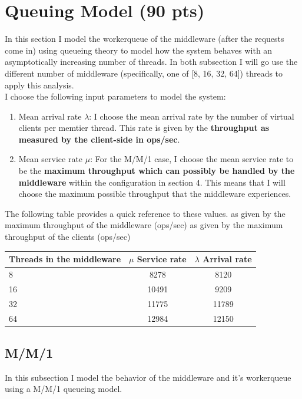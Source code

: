 \documentclass[11pt,a4paper]{article}
\begin{document}
\section{Queuing Model (90 pts)}

In this section I model the workerqueue of the middleware (after the requests come in) using queueing theory to model how the system behaves with an asymptotically increasing number of threads.
In both subsection I will go use the different number of middleware (specifically, one of [8, 16, 32, 64]) threads to apply this analysis. \\

I choose the following input parameters to model the system:

\begin{enumerate}
\item Mean arrival rate $\lambda$: I choose the mean arrival rate by the number of virtual clients per memtier thread.
This rate is given by the \textbf{throughput as measured by the client-side in ops/sec}.
\item Mean service rate $\mu$: For the M/M/1 case, I choose the mean service rate to be the \textbf{maximum throughput which can possibly be handled by the middleware} within the configuration in section 4.
This means that I will choose the maximum possible throughput that the middleware experiences.
\end{enumerate}


The following table provides a quick reference to these values.
as given by the maximum throughput of the middleware (ops/sec) 
as given by the maximum throughput of the clients (ops/sec) 

\begin{center}
	\scriptsize{
		\begin{tabular}{|l|c|c|}
			\hline Threads in the middleware & 
			$\mu$ Service rate &
			$\lambda$ Arrival rate \\ 
			\hline 8 &   8278 & 8120 \\ 
			\hline 16 &  10491 & 9209 \\ 
			\hline 32 &  11775 & 11789 \\
			\hline 64 &  12984 & 12150 \\
			\hline
		\end{tabular}
	} 
\end{center}



\subsection{M/M/1}
In this subsection I model the behavior of the middleware and it's workerqueue using a M/M/1 queueing model. \\
\end{document}
